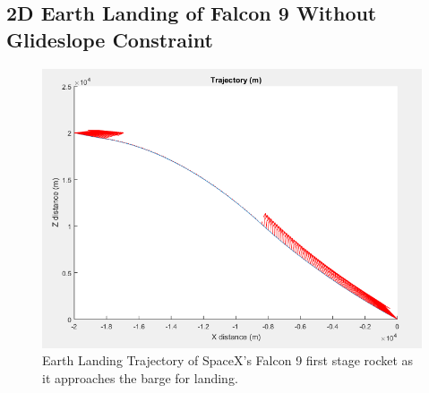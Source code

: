 \documentclass[journal]{new-aiaa}
\begin{document}
\begin{singlespace}
\subsection{2D Earth Landing of Falcon 9 Without Glideslope Constraint}
\begin{figure}[!htb] 
\centering
\includegraphics[width=.6\textwidth]{falcon.PNG}
\caption{Earth Landing Trajectory of SpaceX's Falcon 9 first stage rocket as it approaches the barge for landing.}
\label{fig:falcon}
\end{figure}


\end{singlespace}
\end{document}

